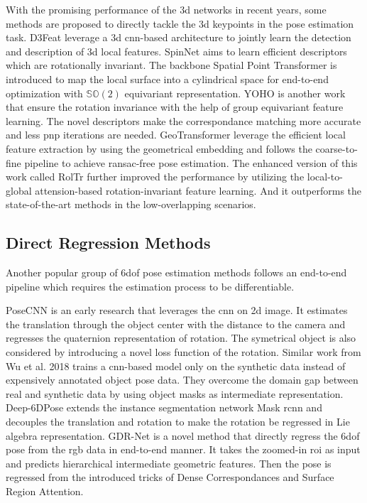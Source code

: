 \documentclass[12pt,DIV14,BCOR12mm,a4paper,footinclude=false,headinclude,parskip=half-,twoside,openright,cleardoublepage=empty,toc=index,bibliography=totoc,listof=totoc]{scrreprt}
\numberwithin{equation}{chapter}
\begin{document}
With the promising performance of the \gls{3d} networks \cite{qi2017pointnet,qi2017pointnet++} in recent years, some methods are proposed to directly tackle the \gls{3d} keypoints in the pose estimation task. D3Feat \cite{bai2020d3feat} leverage a \gls{3d} \gls{cnn}-based architecture to jointly learn the detection and description of \gls{3d} local features. SpinNet \cite{ao2021spinnet} aims to learn efficient descriptors which are rotationally invariant. The backbone Spatial Point Transformer is introduced to map the local surface into a cylindrical space for end-to-end optimization with $\mathbb{SO}(2)$ equivariant representation. YOHO \cite{wang2022hypothesize} is another work that ensure the rotation invariance with the help of group equivariant feature learning. The novel descriptors make the correspondance matching more accurate and less \gls{pnp} iterations are needed. GeoTransformer \cite{qin2022geometric} leverage the efficient local feature extraction by using the geometrical embedding and follows the coarse-to-fine pipeline to achieve \gls{ransac}-free pose estimation. The enhanced version of this work called RolTr \cite{yu2023rotationinvariant} further improved the performance by utilizing the local-to-global attension-based rotation-invariant feature learning. And it outperforms the state-of-the-art methods in the low-overlapping scenarios.


\subsection{Direct Regression Methods}
Another popular group of \gls{6dof} pose estimation methods follows an end-to-end pipeline which requires the estimation process to be differentiable.

PoseCNN\cite{xiang2018posecnn} is an early research that leverages the \gls{cnn} on \gls{2d} image. It estimates the translation through the object center with the distance to the camera and regresses the quaternion representation of rotation. The symetrical object is also considered by introducing a novel loss function of the rotation. Similar work from Wu et al. 2018 \cite{Wu_2018} trains a \gls{cnn}-based model only on the synthetic data instead of expensively annotated object pose data. They overcome the domain gap between real and synthetic data by using object masks as intermediate representation. Deep-6DPose \cite{do2018deep6dpose} extends the instance segmentation network Mask \gls{rcnn} \cite{he2018mask} and decouples the translation and rotation to make the rotation be regressed in Lie algebra representation. GDR-Net \cite{wang2021gdrnet} is a novel method that directly regress the \gls{6dof} pose from the \gls{rgb} data in end-to-end manner. It takes the zoomed-in \gls{roi} as input and predicts hierarchical intermediate geometric features. Then the pose is regressed from the introduced tricks of Dense Correspondances and Surface Region Attention.
\end{document}
